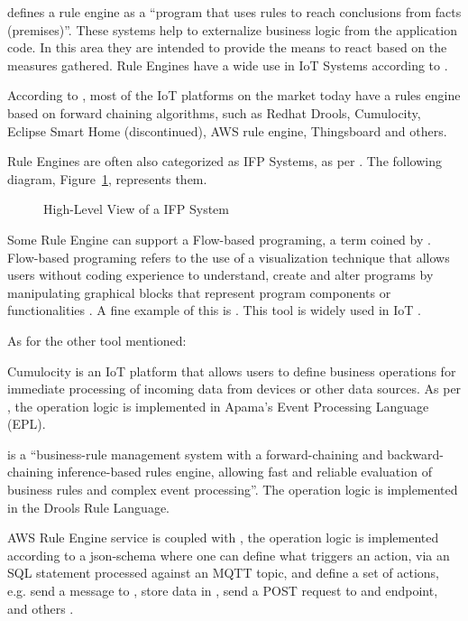 \cite{CHISHOLM20041} defines a rule engine as a ``program that uses rules to reach conclusions from facts (premises)''. These systems help to externalize business logic from the application code. In this area they are intended to provide the means to react based on the measures gathered. 
Rule Engines have a wide use in \gls{IoT} Systems according to \cite{LUO2021220, Milenkovic2020, 8938723}.

According to \cite{rules-waylay}, most of the IoT platforms on the market today have a rules engine based on forward chaining algorithms, such as Redhat Drools, Cumulocity, Eclipse Smart Home (discontinued), AWS rule engine, Thingsboard and others.

Rule Engines are often also categorized as \gls{IFP} Systems, as per \cite{cugola2012processing}.
The following diagram, Figure~\ref{fig:stateofart:arch:infra:rule:ifp}, represents them.

\begin{figure}[H]
   \centering
  \resizebox{\columnwidth}{!}
  {
     
  }
  \caption[High-Level View of a \gls{IFP} System]{High-Level View of a \gls{IFP} System}
  \label{fig:stateofart:arch:infra:rule:ifp}
\end{figure}

Some Rule Engine can support a Flow-based programing, a term coined by \cite{morrison1994flow}. Flow-based programing refers to the use of a visualization technique that allows users without coding experience to understand, create and alter programs by manipulating graphical blocks that represent program
components or functionalities \parencite{morrison2010flow}. A fine example of this is . This tool is widely used in \gls{IoT} \parencite{10.1145/3448891.3448938}.

As for the other tool mentioned:

Cumulocity is an \gls{IoT} platform that allows users to define business operations for immediate processing of incoming data from devices or other data sources. As per \cite{cumulocity}, the operation logic is implemented in Apama's Event Processing Language (EPL).

 is a ``business-rule management system with a forward-chaining and backward-chaining inference-based rules engine, allowing fast and reliable evaluation of business rules and complex event processing''. The operation logic is implemented in the Drools Rule Language.

AWS Rule Engine service is coupled with , the operation logic is implemented according to a json-schema where one can define what triggers an action, via an \gls{SQL} statement processed against an \gls{MQTT} topic, and define a set of actions, e.g. send a message to , store data in , send a POST request to and endpoint, and others \parencite{aws-rules}.

